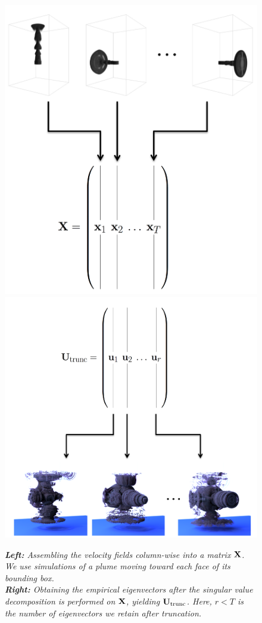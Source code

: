 \documentclass[11pt]{article}
\begin{document}
\begin{figure}
		\centering
		\includegraphics[height=0.45\textwidth]{Figures/plume_inverted_training.png}
		\includegraphics[height=0.45\textwidth]{Figures/U_trunc_recolored.png}
		\caption{{\em{\bf Left:} Assembling the velocity fields column-wise into a matrix $\mathbf{X}$. We use simulations of a plume moving toward each face of its bounding box.}\\{\em{\bf Right:} Obtaining the empirical eigenvectors after the singular value decomposition is performed on $\mathbf{X}$, yielding $\mathbf{U}_{\textnormal{trunc}}$. Here, $r<T$ is the number of eigenvectors we retain after truncation.}}
		\label{fig:matrices}
\end{figure}
	
\end{document}
